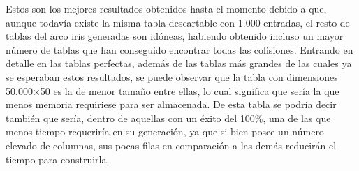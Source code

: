 \documentclass[12pt,spanish,listoffigures,listoftables,listofalgorithms]{tfgetsinf}
\begin{document}
\def\arraystretch{1.5}
\begin{table}[H]
	\LARGE
	\centering
	\caption{Porcentajes de éxito para las tablas empleando la alternancia de las funciones de reconstrucción}
	\label{resR1R2}
\end{table}

Estos son los mejores resultados obtenidos hasta el momento debido a que, aunque todavía existe la misma tabla descartable con 1.000 entradas, el resto de tablas del arco iris generadas son idóneas, habiendo obtenido incluso un mayor número de tablas que han conseguido encontrar todas las colisiones. Entrando en detalle en las tablas perfectas, además de las tablas más grandes de las cuales ya se esperaban estos resultados, se puede observar que la tabla con dimensiones 50.000$\times$50 es la de menor tamaño entre ellas, lo cual significa que sería la que menos memoria requiriese para ser almacenada. De esta tabla se podría decir también que sería, dentro de aquellas con un éxito del 100\%, una de las que menos tiempo requeriría en su generación, ya que si bien posee un número elevado de columnas, sus pocas filas en comparación a las demás reducirán el tiempo para construirla.
\end{document}
